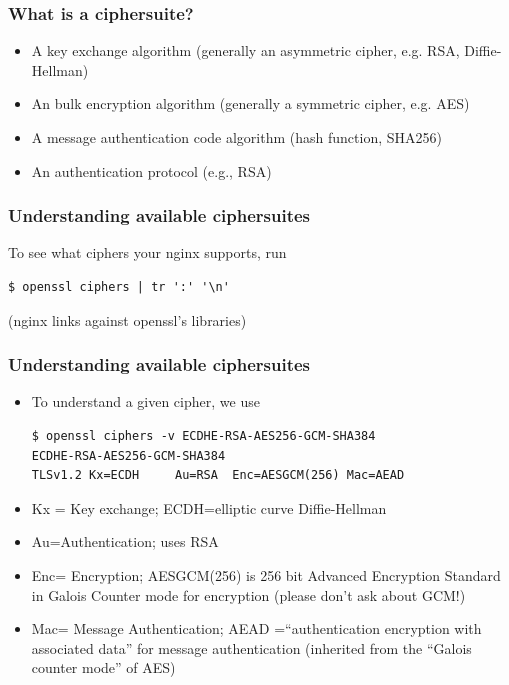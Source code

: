 \documentclass[9pt]{beamer}
\begin{document}
\begin{frame}[fragile]
\frametitle{What is a ciphersuite?}
\pause
\begin{itemize}
\item A key exchange algorithm (generally an asymmetric cipher, e.g. RSA, Diffie-Hellman)
\pause
\item An bulk encryption algorithm (generally a symmetric cipher, e.g. AES)
\pause
\item A message authentication code algorithm  (hash function, SHA256)
\pause
\item An authentication protocol (e.g., RSA)
\end{itemize}
\end{frame}

\begin{frame}[fragile]
\frametitle{Understanding available ciphersuites}
To see what ciphers your nginx supports, run
\begin{verbatim}
$ openssl ciphers | tr ':' '\n'
\end{verbatim}
(nginx links against openssl's libraries)
\end{frame}

\begin{frame}[fragile]
\frametitle{Understanding available ciphersuites}
\begin{itemize}
\item To understand a given cipher, we use
\begin{verbatim}
$ openssl ciphers -v ECDHE-RSA-AES256-GCM-SHA384
ECDHE-RSA-AES256-GCM-SHA384
TLSv1.2 Kx=ECDH     Au=RSA  Enc=AESGCM(256) Mac=AEAD
\end{verbatim}
\pause
\item Kx = Key exchange; ECDH=elliptic curve Diffie-Hellman
\pause
\item Au=Authentication; uses RSA 
\pause
\item  Enc= Encryption; AESGCM(256) is 256 bit Advanced Encryption Standard in Galois Counter mode for encryption (please don't ask about GCM!)
\pause
\item Mac= Message Authentication; AEAD =``authentication encryption with associated data'' for message authentication (inherited from the ``Galois counter mode'' of AES)
\end{itemize}
\end{frame}
\end{document}
